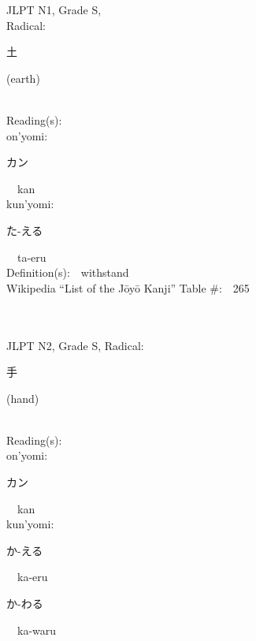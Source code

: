 \begin{multicols}{2}
{JLPT N1, Grade S, \\Radical:\ \ {\begin{CJK}{UTF8}{min} 土 \end{CJK}} (earth) } \\
Reading(s):\ \ \\
{\hspace*{1em}}on'yomi:\ \ \\
{\hspace*{2em}}{\begin{CJK}{UTF8}{min} カン \end{CJK}}\ \ kan\ \ \\
{\hspace*{1em}}kun'yomi:\ \ \\
{\hspace*{2em}}{\begin{CJK}{UTF8}{min} た-える \end{CJK}}\ \ ta-eru\ \ \\
Definition(s):\ \ withstand \\
Wikipedia ``List of the J\=oy\=o Kanji'' Table \#:\ \ 265 \\
\ \ \\
{\fontsize{34pt}{40pt}  }\ \ \\  %
{JLPT N2, Grade S, Radical:\ \ {\begin{CJK}{UTF8}{min} 手 \end{CJK}} (hand) } \\
Reading(s):\ \ \\
{\hspace*{1em}}on'yomi:\ \ \\
{\hspace*{2em}}{\begin{CJK}{UTF8}{min} カン \end{CJK}}\ \ kan\ \ \\
{\hspace*{1em}}kun'yomi:\ \ \\
{\hspace*{2em}}{\begin{CJK}{UTF8}{min} か-える \end{CJK}}\ \ ka-eru\ \ \\
{\hspace*{2em}}{\begin{CJK}{UTF8}{min} か-わる \end{CJK}}\ \ ka-waru\ \ \\

\end{multicols}
